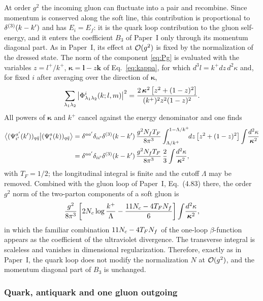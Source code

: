 At order $g^{2}$ the incoming gluon can fluctuate into a pair and recombine. Since momentum is
conserved along the soft line, this contribution is proportional to $\delta^{(3)}(k-k')$ and has
$E_{i}=E_{f}$: it is the quark loop contribution to the gluon self-energy, and it enters the
coefficient $B_{3}$ of Paper~I only through its momentum diagonal part. As in Paper~I, its effect
at $\mathcal{O}(g^{2})$ is fixed by the normalization of the dressed state. The norm of the component
\eqref{eq:Pg} is evaluated with the variables $z=l^{+}/k^{+}$, $\bm\kappa=\bm l-z\bm k$ of
Eq.~\eqref{eq:kappa}, for which $d^{3}l=k^{+}dz\,d^{2}\kappa$ and, for fixed $i$ after averaging over the direction of
$\bm\kappa$,
\begin{equation}
\sum_{\lambda_{1}\lambda_{2}}\big|\Phi^{i}_{\lambda_{1}\lambda_{2}}(k;l,m)\big|^{2}
=\frac{2\,\bm\kappa^{2}\,\big[z^{2}+(1-z)^{2}\big]}{(k^{+})^{2}z^{2}(1-z)^{2}} .
\label{eq:PhiSq}
\end{equation}
All powers of $\bm\kappa$ and $k^{+}$ cancel against the energy denominator and one finds
\begin{align}
\big\langle(\Psi^{a'}_{i'}(k'))_{q\bar q}\big|(\Psi^{a}_{i}(k))_{q\bar q}\big\rangle
&=\delta^{aa'}\delta_{ii'}\delta^{(3)}(k-k')\,\frac{g^{2}N_{f} T_{F}}{8\pi^{3}}
\int_{\Lambda/k^{+}}^{1-\Lambda/k^{+}}\!\!dz\,\big[z^{2}+(1-z)^{2}\big]\int\!\frac{d^{2}\kappa}{\bm\kappa^{2}}
\nonumber\\
&=\delta^{aa'}\delta_{ii'}\delta^{(3)}(k-k')\,\frac{g^{2}N_{f} T_{F}}{8\pi^{3}}\,\frac{2}{3}\int\!\frac{d^{2}\kappa}{\bm\kappa^{2}},
\label{eq:qloop}
\end{align}
with $T_{F}=1/2$; the longitudinal integral is finite and the cutoff $\Lambda$ may be removed.
Combined with the gluon loop of Paper~I, Eq.~(4.83) there, the order $g^{2}$ norm of the
two-parton components of a soft gluon is
\begin{equation}
\frac{g^{2}}{8\pi^{3}}\left[2N_{c}\log\frac{k^{+}}{\Lambda}-\frac{11N_{c}-4T_{F}N_{f}}{6}\right]
\int\!\frac{d^{2}\kappa}{\bm\kappa^{2}},
\label{eq:gnorm}
\end{equation}
in which the familiar combination $11N_{c}-4T_{F}N_{f}$ of the one-loop $\beta$-function appears as
the coefficient of the ultraviolet divergence. The transverse integral is scaleless and vanishes
in dimensional regularization. Therefore, exactly as in Paper~I, the quark loop does not modify
the normalization $N$ at $\mathcal{O}(g^{2})$, and the momentum diagonal part of $B_{3}$ is unchanged.

\subsubsection{Quark, antiquark and one gluon outgoing}

